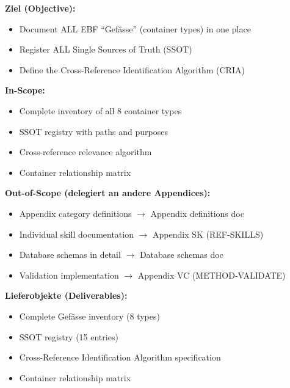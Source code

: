
\begin{tcolorbox}[
    colback=orange!5!white,
    colframe=orange!75!black,
    title={\textbf{Appendix Scope: Ziel / In-Scope / Out-of-Scope / Lieferobjekte}},
    fonttitle=\bfseries
]

\textbf{Ziel (Objective):}
\begin{itemize}[nosep]
    \item Document ALL EBF ``Gefässe'' (container types) in one place
    \item Register ALL Single Sources of Truth (SSOT)
    \item Define the Cross-Reference Identification Algorithm (CRIA)
\end{itemize}

\textbf{In-Scope:}
\begin{itemize}[nosep]
    \item Complete inventory of all 8 container types
    \item SSOT registry with paths and purposes
    \item Cross-reference relevance algorithm
    \item Container relationship matrix
\end{itemize}

\textbf{Out-of-Scope (delegiert an andere Appendices):}
\begin{itemize}[nosep]
    \item Appendix category definitions $\rightarrow$ Appendix definitions doc
    \item Individual skill documentation $\rightarrow$ Appendix SK (REF-SKILLS)
    \item Database schemas in detail $\rightarrow$ Database schemas doc
    \item Validation implementation $\rightarrow$ Appendix VC (METHOD-VALIDATE)
\end{itemize}

\textbf{Lieferobjekte (Deliverables):}
\begin{itemize}[nosep]
    \item Complete Gefässe inventory (8 types)
    \item SSOT registry (15 entries)
    \item Cross-Reference Identification Algorithm specification
    \item Container relationship matrix
\end{itemize}

\end{tcolorbox}


